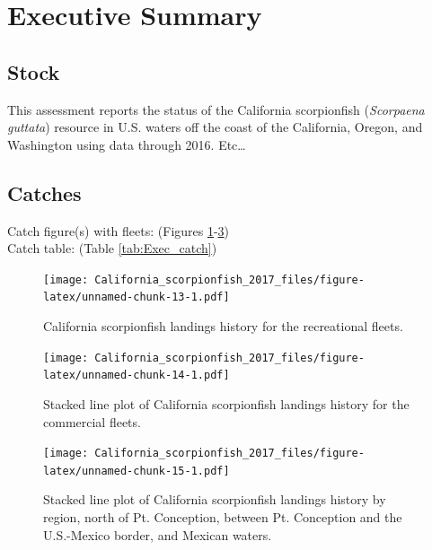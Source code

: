 \documentclass[12pt,]{article}
\begin{document}
{
\setcounter{tocdepth}{4}
\tableofcontents
}
\setlength{\parskip}{5mm plus1mm minus1mm} \pagebreak

 \setcounter{page}{1}
\renewcommand{\thefigure}{\alph{figure}}
\renewcommand{\thetable}{\alph{table}}

\section*{Executive Summary}\label{executive-summary}

\subsection*{Stock}\label{stock}

This assessment reports the status of the California scorpionfish
(\emph{Scorpaena guttata}) resource in U.S. waters off the coast of the
California, Oregon, and Washington using data through 2016. Etc\ldots{}

\subsection*{Catches}\label{catches}

Catch figure(s) with fleets: (Figures
\ref{fig:Exec_catch1}-\ref{fig:Exec_catch3})\\
Catch table: (Table \ref{tab:Exec_catch})

\FloatBarrier

\begin{figure}[htbp]
\centering
\texttt{[image: California\_scorpionfish\_2017\_files/figure-latex/unnamed-chunk-13-1.pdf]}
\caption{California scorpionfish landings history for the recreational
fleets. \label{fig:Exec_catch1}}
\end{figure}

\begin{figure}[htbp]
\centering
\texttt{[image: California\_scorpionfish\_2017\_files/figure-latex/unnamed-chunk-14-1.pdf]}
\caption{Stacked line plot of California scorpionfish landings history
for the commercial fleets. \label{fig:Exec_catch2}}
\end{figure}

\begin{figure}[htbp]
\centering
\texttt{[image: California\_scorpionfish\_2017\_files/figure-latex/unnamed-chunk-15-1.pdf]}
\caption{Stacked line plot of California scorpionfish landings history
by region, north of Pt. Conception, between Pt. Conception and the
U.S.-Mexico border, and Mexican waters. \label{fig:Exec_catch3}}
\end{figure}
\end{document}
